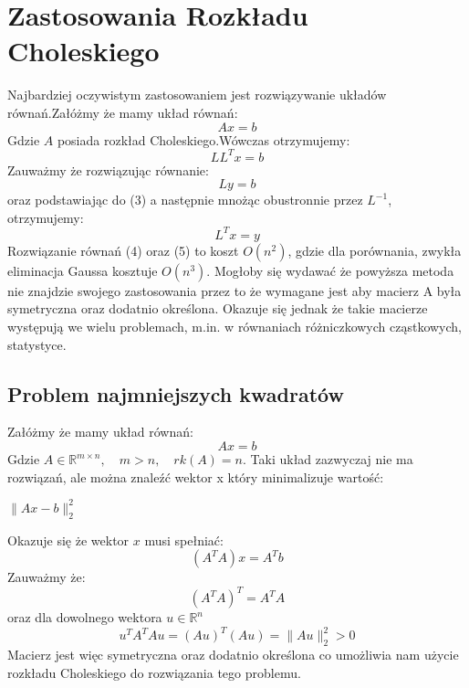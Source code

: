 \documentclass[11pt,wide]{article}
\begin{document}
\section{Zastosowania Rozkładu Choleskiego}
Najbardziej oczywistym zastosowaniem jest rozwiązywanie układów równań.Załóżmy że mamy układ równań:
\begin{equation}
Ax = b
\end{equation}
Gdzie $A$ posiada rozkład Choleskiego.Wówczas otrzymujemy:
\begin{equation}
LL^Tx = b
\end{equation}
Zauważmy że rozwiązując równanie:
\begin{equation}
Ly = b
\end{equation}
oraz podstawiając do (3) a następnie mnożąc obustronnie przez $L^{-1}$, otrzymujemy:
\begin{equation}
L^Tx = y
\end{equation}
Rozwiązanie równań (4) oraz (5) to koszt $O(n^2)$, gdzie dla porównania, zwykła eliminacja Gaussa kosztuje $O(n^3)$.
\noindent
Mogłoby się wydawać że powyższa metoda nie znajdzie swojego zastosowania przez to że wymagane jest aby macierz A była symetryczna oraz dodatnio określona. Okazuje się jednak że takie macierze występują we wielu problemach, m.in. w równaniach różniczkowych cząstkowych, statystyce.

\subsection{Problem najmniejszych kwadratów}
Załóżmy że mamy układ równań:
\begin{equation}
Ax = b
\end{equation}
Gdzie $A \in \mathbb{R}^{m \times n}, \quad m > n,\quad rk(A) = n$.\newline
Taki układ zazwyczaj nie ma rozwiązań, ale można znaleźć wektor x który minimalizuje wartość:
\begin{center}
$\lVert Ax-b\rVert_2^2$
\end{center}
Okazuje się że wektor $x$ musi spełniać:
\begin{equation}
(A^TA)x = A^Tb
\end{equation}
Zauważmy że:
\begin{equation}
(A^TA)^T = A^TA
\end{equation}
oraz dla dowolnego wektora $u \in \mathbb{R}^n$
\begin{equation}
u^TA^TAu = (Au)^T(Au) = \lVert Au \rVert_2^2 > 0
\end{equation}
Macierz jest więc symetryczna oraz dodatnio określona co umożliwia nam użycie rozkładu Choleskiego do rozwiązania tego problemu.
\end{document}

